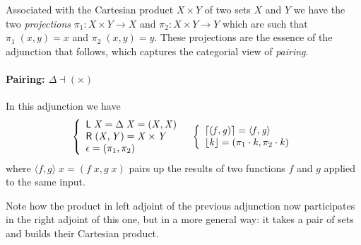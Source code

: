 \documentclass{elsarticle}
\newcommand{\Conid}[1]{\mathit{#1}}
\newcommand{\Varid}[1]{\mathit{#1}}
\newenvironment{lcbr}{\left\{\begin{array}{l}}{\end{array}\right.}
\def\comp{ \mathbin{\cdot} }
\def\fun#1{\mathsf{#1}}
\def\p#1{\pi_{#1}}
\def\conj#1#2{\mathopen{\langle} #1, #2 \mathclose{\rangle}}
\begin{document}
Associated with the Cartesian product \ensuremath{\Conid{X} \times \Conid{Y}} of two sets \ensuremath{\Conid{X}} and \ensuremath{\Conid{Y}} we have the two \emph{projections} 
\ensuremath{\p1\mathbin{:}\Conid{X} \times \Conid{Y}\to \Conid{X}} and \ensuremath{\p2\mathbin{:}\Conid{X} \times \Conid{Y}\to \Conid{Y}} which are such that \ensuremath{\p1\;(\Varid{x},\Varid{y})\mathrel{=}\Varid{x}}
and \ensuremath{\p2\;(\Varid{x},\Varid{y})\mathrel{=}\Varid{y}}. These projections are the essence of the adjunction that
follows, which captures the categorial view of \emph{pairing}.

\paragraph{Pairing: \ensuremath{\Delta \mathbin\dashv ( \times )}} In this adjunction we have
\begin{eqnarray}
	\ensuremath{\begin{lcbr}\fun L \;\Conid{X}\mathrel{=}\Delta \;\Conid{X}\mathrel{=}(\Conid{X},\Conid{X})\\\fun R \;(\Conid{X},\Conid{Y})\mathrel{=}\Conid{X} \times \Conid{Y}\\\epsilon \mathrel{=}(\p1,\p2)\end{lcbr}}
&&
	\ensuremath{\begin{lcbr}\lceil (\Varid{f},\Varid{g})\rceil\mathrel{=}\conj{\Varid{f}}{\Varid{g}}\\\lfloor \Varid{k}\rfloor\mathrel{=}(\p1 \comp \Varid{k},\p2 \comp \Varid{k})\end{lcbr}}
	\label{eq:230208d}
\end{eqnarray}
where \ensuremath{\conj{\Varid{f}}{\Varid{g}}\;\Varid{x}\mathrel{=}(\Varid{f}\;\Varid{x},\Varid{g}\;\Varid{x})} pairs up the results of two functions \ensuremath{\Varid{f}} and \ensuremath{\Varid{g}} applied
to the same input.

Note how the product in left adjoint of the previous adjunction now participates in the right
adjoint of this one, but in a more general way: it takes a pair of sets and builds their
Cartesian product.
\end{document}
